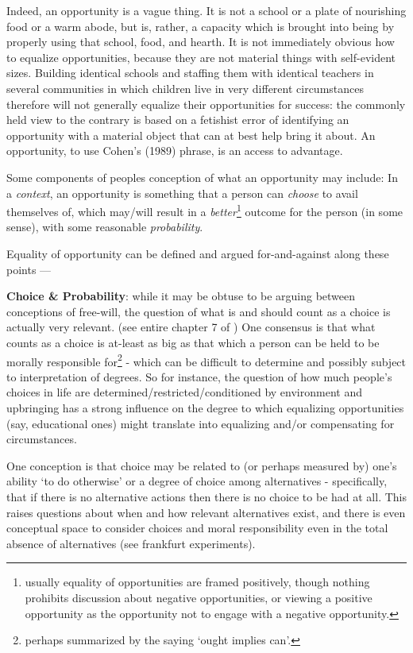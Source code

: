 \documentclass{article}
\begin{document}
\begin{displayquote}
Indeed, an opportunity is a vague thing. It is not a school or a plate
of nourishing food or a warm abode, but is, rather, a capacity which is
brought into being by properly using that school, food, and hearth. It is not
immediately obvious how to equalize opportunities, because they are not
material things with self-evident sizes. 
Building identical schools and staffing them with identical teachers in several communities in which children live in very different circumstances therefore will not generally equalize their opportunities for success: the commonly held view to the contrary is based on a fetishist error of identifying an opportunity with a material object that can at best help bring it about. 
An opportunity, to use Cohen’s (1989) phrase, is an access to advantage.
\cite{roemer_equalityofopportunity}
\end{displayquote}

Some components of peoples conception of what an opportunity may include:
In a \textit{context}, an opportunity is something that a person can \textit{choose} to avail themselves of, which may/will result in a \textit{better}\footnote{usually equality of opportunities are framed positively, though nothing prohibits discussion about negative opportunities, or viewing a positive opportunity as the opportunity not to engage with a negative opportunity.} outcome for the person (in some sense), with some reasonable \textit{probability}.

Equality of opportunity can be defined and argued for-and-against along these points ---

\textbf{Choice \& Probability}: while it may be obtuse to be arguing between conceptions of free-will, the question of what is and should count as a choice is actually very relevant. (see entire chapter 7 of \cite{mason2006levelling})
One consensus is that what counts as a choice is at-least as big as that which a person can be held to be morally responsible for\footnote{perhaps summarized by the saying `ought implies can'.} - which can be difficult to determine and possibly subject to interpretation of degrees.
So for instance, the question of how much people's choices in life are determined/restricted/conditioned by environment and upbringing has a strong influence on the degree to which equalizing opportunities (say, educational ones) might translate into equalizing and/or compensating for circumstances.

One conception is that choice may be related to (or perhaps measured by) one's ability `to do otherwise' or a degree of choice among alternatives - specifically, that if there is no alternative actions then there is no choice to be had at all.
This raises questions about when and how relevant alternatives exist, and there is even conceptual space to consider choices and moral responsibility even in the total absence of alternatives (see frankfurt experiments).
\end{document}
